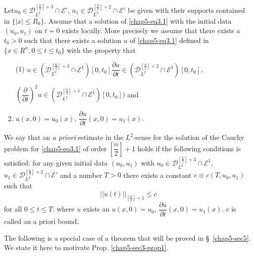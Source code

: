 Let\pageoriginale $u_0 \in \mathscr{D}^{\left[\frac{n}{2}\right] +
  3}_{L^2} \cap 
\mathscr{E}'$, $u_1 \in \mathscr{D}^{\left[\frac{n}{2}\right] +
  2}_{L^2} \cap \mathscr{E}'$ be given with their supports contained
in $\{|x| \leq R_0\}$. Assume that a solution of \eqref{chap5-eq3.1}
with the initial 
data $(u_0, u_1) $ on $t = 0$ exists locally. More precisely we assume
that there exists a $t_0 > 0$ such that there exists a solution $u$ of
\eqref{chap5-eq3.1} defined in $\{ x  \in \underline{R}^n , 0 \leq t \leq
t_0 \}$ with the property that  
\begin{enumerate}
\item[(1)] $u \in (\mathscr{D}^{\left[\frac{n}{2}\right] +
  3}_{L^2} \cap 
  \mathscr{E}^1) [0, t_0]\dfrac{\partial u}{\partial t}
  \in (\mathscr{D}^{\left[\frac{n}{2}\right] + 2}_{L^2} \cap
  \mathscr{E}^1) [0, t_0]$,

\noindent
 $\left(\dfrac{\partial}{\partial t}\right)^2 u
  \in(\mathscr{D}^{\left[\frac{n}{2}\right]+1}_{L^2} \cap
  \mathscr{E}^1) [ 0, t_0])$ and  

\item $u(x, 0) = u_0 (x)$, $\dfrac{\partial u}{\partial t} (x, 0) =
  u_1 (x)$.  
\end{enumerate}

We say that an \textit{a priori} estimate in the $L^2$-sense for the
solution of the Cauchy problem for \eqref{chap5-eq3.1} of order
$\left[\dfrac{n}{2}\right]+ 1$ holds if the following conditions is
satisfied: for any given initial data $(u_0 , u_1)$ with $u_0 \in
\mathscr{D}^{\left[\frac{n}{2}\right]+3}_{L^2}  \cap \mathscr{E}^1$, $u_1
\in \mathscr{D}^{\left[\frac{n}{2}\right]+2}_{L^2} \cap \mathscr{E}'$
and a number $T > 0$ there exists a constant $c \equiv c(T, u_0, u_1)$
such that  
$$
|| u (t) ||_{\left[\frac{n}{2} \right]+1} \leq c 
$$ 
for all $0 \leq t \leq T$. where $u$ exists an $u(x, 0) = u_0$,
$\dfrac{\partial u}{\partial t} (x, 0) = u_1 (x)$. $c$ is called an a
priori bound.  

The following is a special case of a theorem that will be proved in \S\
\ref{chap5-sec5}. We state it here to motivate
Prop. \ref{chap5-sec3-prop1}.   

